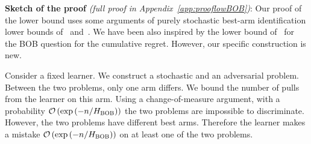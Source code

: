 %
%

\vspace{.5cm}
\noindent\textbf{Sketch of the proof} 
\textit{(full proof in 
	Appendix~\ref{app:prooflowBOB})}:
Our proof of the lower bound uses some arguments of purely stochastic best-arm identification 
lower bounds of~\cite{Audibert10BA} and~\cite{Carpentier16TB}.
We have been also inspired by the lower bound of~\cite{Auer16AA} 
for the BOB question for the cumulative regret. However, 
our specific construction is new.

Consider a fixed learner. 
We construct a stochastic and an adversarial problem.
Between the two problems, only one arm differs.
We bound the number of pulls from the learner on this arm.
Using a change-of-measure argument,  
 with a probability  $\mathcal{O}\left(\exp\left(-n/H_{{\normalfont \textsc{{BOB}}}}\right)\right)$ 
 the two problems are impossible to discriminate. 
However, the two problems have different best arms. 
Therefore the learner makes a mistake $\mathcal{O}\left(\exp\left(-n/H_{{\normalfont \textsc{{BOB}}}}\right)\right)$ 
on at least one of the two problems.

